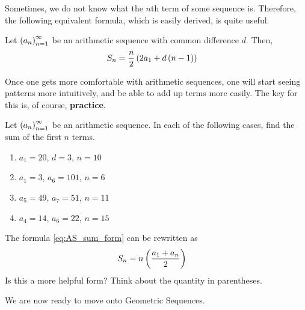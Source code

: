 Sometimes, we do not know what the $n$th term of some sequence is. Therefore, the following equivalent formula, which is easily derived, is quite useful.
\begin{boxexercise}
Let $\left( a_n \right)_{n=1}^{\infty}$ be an arithmetic sequence with common difference $d$. Then,
\begin{align}
    S_n &= \frac{n}{2}\left( 2a_1 + d\left( n-1 \right) \right)
\end{align}
\end{boxexercise}
Once one gets more comfortable with arithmetic sequences, one will start seeing patterns more intuitively, and be able to add up terms more easily. The key for this is, of course, \textbf{practice}.
\begin{boxexercise}
    Let $\left( a_n \right)_{n=1}^{\infty}$ be an arithmetic sequence. In each of the following cases, find the sum of the first $n$ terms.
    \begin{enumerate}[noitemsep]
        \item $a_1 = 20$, $d = 3$, $n = 10$
        \item $a_1 = 3$, $a_6 = 101$, $n = 6$
        \item $a_5 = 49$, $a_{7} = 51$, $n = 11$
        \item $a_4 = 14$, $a_6 = 22$, $n = 15$
    \end{enumerate}
    \begin{hint}
        The formula \eqref{eq:AS_sum_form} can be rewritten as
        \begin{align*}
            S_n &= n\left( \frac{a_1 + a_n}{2} \right)   
        \end{align*}
        Is this a more helpful form? Think about the quantity in parentheses.
    \end{hint}
\end{boxexercise}

We are now ready to move onto Geometric Sequences.